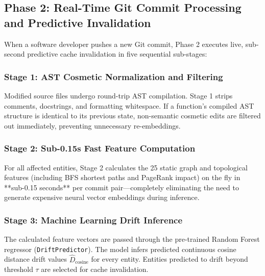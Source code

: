 \documentclass[conference]{IEEEtran}
\begin{document}
\subsection{Phase 2: Real-Time Git Commit Processing and Predictive Invalidation}
When a software developer pushes a new Git commit, Phase 2 executes live, sub-second predictive cache invalidation in five sequential sub-stages:

\subsubsection{Stage 1: AST Cosmetic Normalization and Filtering}
Modified source files undergo round-trip AST compilation. Stage 1 strips comments, docstrings, and formatting whitespace. If a function's compiled AST structure is identical to its previous state, non-semantic cosmetic edits are filtered out immediately, preventing unnecessary re-embeddings.

\subsubsection{Stage 2: Sub-0.15s Fast Feature Computation}
For all affected entities, Stage 2 calculates the 25 static graph and topological features (including BFS shortest paths and PageRank impact) on the fly in **sub-0.15 seconds** per commit pair—completely eliminating the need to generate expensive neural vector embeddings during inference.

\subsubsection{Stage 3: Machine Learning Drift Inference}
The calculated feature vectors are passed through the pre-trained Random Forest regressor (\texttt{DriftPredictor}). The model infers predicted continuous cosine distance drift values $\hat{D}_{\text{cosine}}$ for every entity. Entities predicted to drift beyond threshold $\tau$ are selected for cache invalidation.
\end{document}
